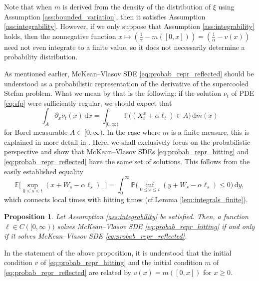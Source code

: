 \documentclass[11pt, a4paper]{article}
\theoremstyle{plain}
\newtheorem{proposition}[theorem]{Proposition}
\theoremstyle{definition}
\theoremstyle{remark}
\numberwithin{equation}{section}
\newcommand{\ev}{\mathbb{E}}
\newcommand{\pr}{\mathbb{P}}
\renewcommand{\d}{\mathrm{d}}
\begin{document}
Note that when $m$ is derived from the density of the distribution of $\xi$ using Assumption \ref{ass:bounded_variation}, then it satisfies Assumption \ref{ass:integrability}. However, if we only suppose that Assumption \ref{ass:integrability} holds, then the nonnegative function $x \mapsto (\frac{1}{\alpha} - m([0, x])) = (\frac{1}{\alpha} - v(x))$ need not even integrate to a finite value, so it does not necessarily determine a probability distribution.

As mentioned earlier, McKean--Vlasov SDE \eqref{eq:probab_repr_reflected} should be understood as a probabilistic representation of the derivative of the supercooled Stefan problem. What we mean by that is the following: if the solution $\nu_t$ of PDE \eqref{eq:sfp} were sufficiently regular, we should expect that
\begin{equation}
    \int_A \partial_x \nu_t(x) \, \d x = \int_{[0, \infty)} \pr\bigl((X^x_t + \alpha \ell_t) \in A\bigr) \, \d m(x)
\end{equation}
for Borel measurable $A \subset [0, \infty)$. In the case where $m$ is a finite measure, this is explained in more detail in \cite[Subsection 1.5.2]{baker_loc_times_2025}. Here, we shall exclusively focus on the probabilistic perspective and show that McKean--Vlasov SDEs \eqref{eq:probab_repr_hitting} and \eqref{eq:probab_repr_reflected} have the same set of solutions. This follows from the easily established equality
\begin{equation} \label{eq:local_to_hitting_intro}
    \ev\biggl[\sup_{0 \leq s \leq t} (x + W_s - \alpha \ell_s)_-\biggr] = \int_0^{\infty} \pr\biggl(\inf_{0 \leq s \leq t} (y + W_s - \alpha \ell_s) \leq 0\biggr) \, \d y,
\end{equation}
which connects local times with hitting times (cf.\@ Lemma \ref{lem:integrals_finite}). 

\begin{proposition} \label{prop:equivalence}
Let Assumption \ref{ass:integrability} be satisfied. Then, a function $\ell \in C([0, \infty))$ solves McKean--Vlasov SDE \eqref{eq:probab_repr_hitting} if and only if it solves McKean--Vlasov SDE \eqref{eq:probab_repr_reflected}. 
\end{proposition}

In the statement of the above proposition, it is understood that the initial condition $v$ of \eqref{eq:probab_repr_hitting} and the initial condition $m$ of \eqref{eq:probab_repr_reflected} are related by $v(x) = m([0, x])$ for $x \geq 0$.
\end{document}
